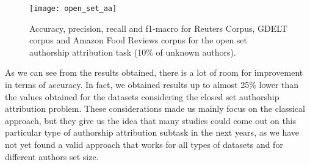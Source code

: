 \begin{figure}[ht]
	\centering
	\texttt{[image: open\_set\_aa]}
	\caption[Results of our single topic dataset with open set authorship attribution]{Accuracy, precision, recall and f1-macro for Reuters Corpus, GDELT corpus and Amazon Food Reviews corpus for the open set authorship attribution task (10\% of unknown authors).}
	\label{fig:results_open_set}
\end{figure}

As we can see from the results obtained, there is a lot of room for improvement in terms of accuracy. In fact, we obtained results up to almost 25\% lower than the values obtained for the datasets considering the closed set authorship attribution problem.
These considerations made us mainly focus on the classical approach, but they give us the idea that many studies could come out on this particular type of authorship attribution subtask in the next years, as we have not yet found a valid approach that works for all types of datasets and for different authors set size.
